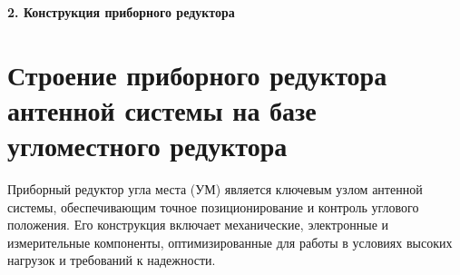 \newpage
\begin{center}
  \textbf{\large 2. Конструкция приборного редуктора}
\end{center}


\section{Строение приборного редуктора антенной системы на базе угломестного редуктора}

Приборный редуктор угла места (УМ) является ключевым узлом антенной системы, обеспечивающим точное позиционирование и контроль углового положения. 
Его конструкция включает механические, электронные и измерительные компоненты, оптимизированные для работы в условиях высоких нагрузок и требований к надежности.

